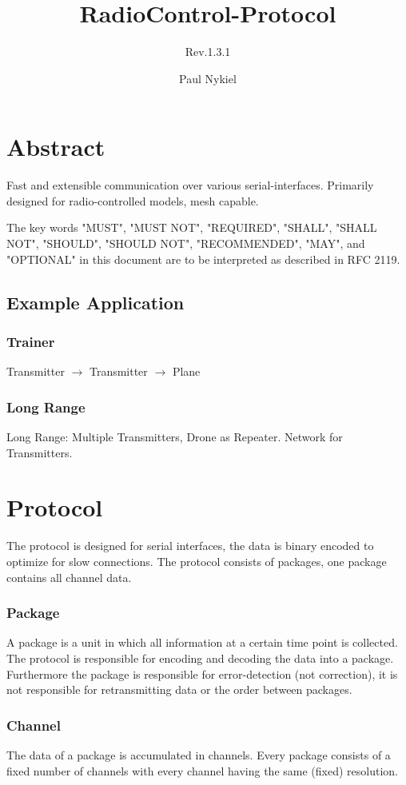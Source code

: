 \documentclass{scrreprt}
\title{RadioControl-Protocol}
\subtitle{Rev.1.3.1}
\author{Paul Nykiel}
\begin{document}
\maketitle
\tableofcontents

\pagebreak

\chapter{Abstract}
Fast and extensible communication over various serial-interfaces. Primarily
designed for radio-controlled models, mesh capable.

The key words "MUST", "MUST NOT", "REQUIRED", "SHALL", "SHALL
NOT", "SHOULD", "SHOULD NOT", "RECOMMENDED",  "MAY", and
"OPTIONAL" in this document are to be interpreted as described in
RFC 2119.

\section{Example Application}
\subsection{Trainer}
Transmitter $\to$ Transmitter $\to$ Plane
\subsection{Long Range}
Long Range: Multiple Transmitters, Drone as Repeater. Network for Transmitters.

\chapter{Protocol}
The protocol is designed for serial interfaces, the data is binary encoded to
optimize for slow connections. The protocol consists of packages, one package
contains all channel data.

\subsection{Package}
A package is a unit in which all information at a certain time point is collected.
The protocol is responsible for encoding and decoding the data into a package.
Furthermore the package is responsible for error-detection (not correction), it
is not responsible for retransmitting data or the order between packages.

\subsection{Channel}
The data of a package is accumulated in channels. Every package consists of a fixed
number of channels with every channel having the same (fixed) resolution.
\end{document}
